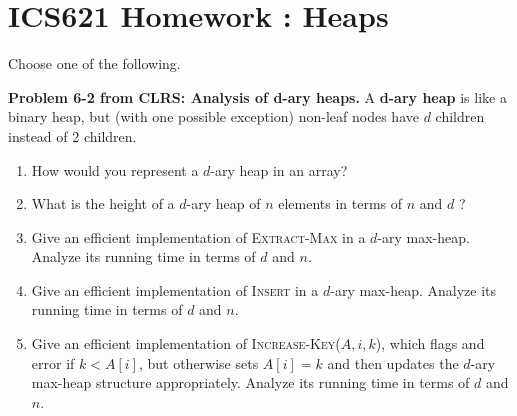 \documentclass[11pt,letterpaper]{article}
\newcommand{\homework}[2]{
\setcounter{section}{#1}
\section*{ICS621 Homework {\thesection}: {#2} }
{\markboth{#2}{#2}}
}
\begin{document}
\homework{2}{Heaps}

\noindent Choose one of the following.

\noindent
\textbf{Problem 6-2 from CLRS: Analysis of d-ary heaps.}  
A \textbf{d-ary heap} is like a binary heap, but (with one
possible exception) non-leaf nodes have $d$ children instead
of 2 children.
\begin{enumerate}[label=\alph*),labelindent=0pt]
\item How would you represent a $d$-ary heap in an array?
\item What is the height of a $d$-ary heap of $n$ elements
in terms of $n$ and $d$ ?
\item Give an efficient implementation of
\textsc{Extract-Max} in a $d$-ary max-heap. Analyze its
running time in terms of $d$ and $n$.
\item Give an efficient implementation of \textsc{Insert} in
a $d$-ary max-heap. Analyze its running time in terms of $d$
and $n$.
\item Give an efficient implementation of
\textsc{Increase-Key($A,i,k$)}, which flags and error if
$k<A[i]$, but otherwise sets $A[i]=k$ and then updates the
$d$-ary max-heap structure appropriately. Analyze its
running time in terms of $d$ and $n$.
\end{enumerate}
\end{document}
